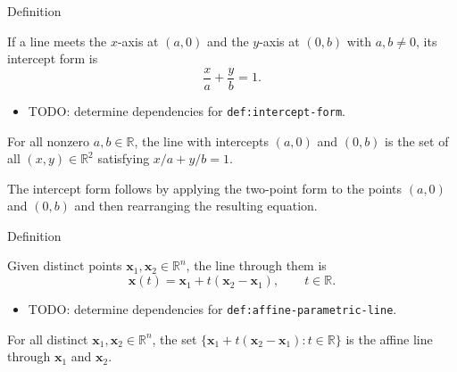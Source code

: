 \begin{definitionbox}{Definition}
\begin{definition}
\label{def:intercept-form}
If a line meets the $x$-axis at $(a,0)$ and the $y$-axis at $(0,b)$ with
$a,b\neq 0$, its intercept form is
\[
  \frac{x}{a}+\frac{y}{b}=1.
\]
\end{definition}
\end{definitionbox}

\begin{dependencies}
\begin{itemize}
  \item TODO: determine dependencies for \texttt{def:intercept-form}.
\end{itemize}
\end{dependencies}

\begin{remark*}
For all nonzero $a,b\in\mathbb{R}$, the line with intercepts $(a,0)$ and
$(0,b)$ is the set of all $(x,y)\in\mathbb{R}^2$ satisfying
$x/a+y/b=1$.
\end{remark*}

\begin{remark*}[Derivation]
The intercept form follows by applying the two-point form to the points
$(a,0)$ and $(0,b)$ and then rearranging the resulting equation.
\end{remark*}

\begin{definitionbox}{Definition}
\begin{definition}
\label{def:affine-parametric-line}
Given distinct points $\mathbf x_1,\mathbf x_2\in\mathbb{R}^n$, the line
through them is
\[
  \mathbf x(t)=\mathbf x_1+t(\mathbf x_2-\mathbf x_1),
  \qquad t\in\mathbb{R}.
\]
\end{definition}
\end{definitionbox}

\begin{dependencies}
\begin{itemize}
  \item TODO: determine dependencies for \texttt{def:affine-parametric-line}.
\end{itemize}
\end{dependencies}

\begin{remark*}
For all distinct $\mathbf x_1,\mathbf x_2\in\mathbb{R}^n$, the set
$\{\mathbf x_1+t(\mathbf x_2-\mathbf x_1):t\in\mathbb{R}\}$ is the affine
line through $\mathbf x_1$ and $\mathbf x_2$.
\end{remark*}

